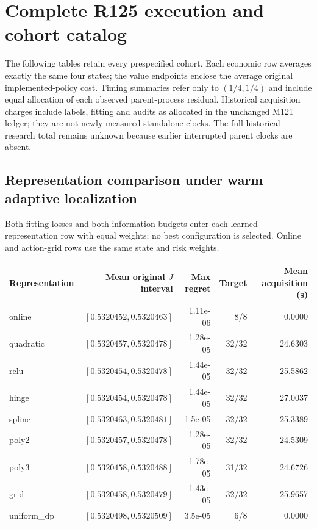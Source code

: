 \section{Complete R125 execution and cohort catalog}
\label{dev:results125}
The following tables retain every prespecified cohort. Each economic row averages exactly the same four states; the value endpoints enclose the average original implemented-policy cost. Timing summaries refer only to $(1/4,1/4)$ and include equal allocation of each observed parent-process residual. Historical acquisition charges include labels, fitting and audits as allocated in the unchanged M121 ledger; they are not newly measured standalone clocks. The full historical research total remains unknown because earlier interrupted parent clocks are absent.
\subsection{Representation comparison under warm adaptive localization}
Both fitting losses and both information budgets enter each learned-representation row with equal weights; no best configuration is selected. Online and action-grid rows use the same state and risk weights.
\begin{center}\small
\begin{tabular}{lrrrr}
\hline
Representation & Mean original $J$ interval & Max regret & Target & Mean acquisition (s) \\
\hline
online & $[0.5320452,0.5320463]$ & 1.11e-06 & 8/8 & 0.0000 \\
quadratic & $[0.5320457,0.5320478]$ & 1.28e-05 & 32/32 & 24.6303 \\
relu & $[0.5320454,0.5320478]$ & 1.44e-05 & 32/32 & 25.5862 \\
hinge & $[0.5320454,0.5320478]$ & 1.44e-05 & 32/32 & 27.0037 \\
spline & $[0.5320463,0.5320481]$ & 1.5e-05 & 32/32 & 25.3389 \\
poly2 & $[0.5320457,0.5320478]$ & 1.28e-05 & 32/32 & 24.5309 \\
poly3 & $[0.5320458,0.5320488]$ & 1.78e-05 & 31/32 & 24.6726 \\
grid & $[0.5320458,0.5320479]$ & 1.43e-05 & 32/32 & 25.9657 \\
uniform\_dp & $[0.5320498,0.5320509]$ & 3.5e-05 & 6/8 & 0.0000 \\
\hline\end{tabular}\end{center}
